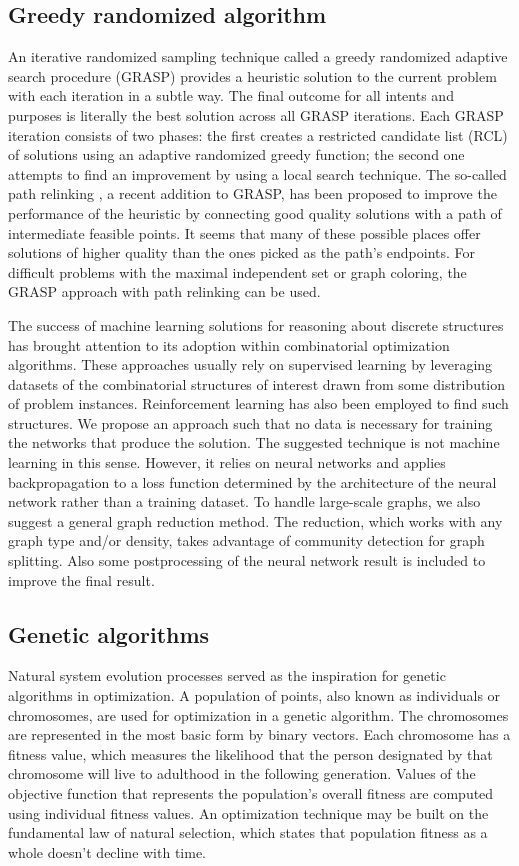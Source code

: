 \subsection{Greedy randomized algorithm}
An iterative randomized sampling technique called a greedy randomized adaptive search procedure (GRASP) provides a heuristic solution to the current problem with each iteration \cite{fr95} in a subtle way. The final outcome for all intents and purposes is literally the best solution across all GRASP iterations. Each GRASP iteration consists of two phases: the first creates a restricted candidate list (RCL) of solutions using an adaptive randomized greedy function; the second one attempts to find an improvement by using a local search technique. 
The so-called path relinking \cite{glm00} , a recent addition to GRASP, has been proposed to improve the performance of the heuristic by connecting good quality solutions with a path of intermediate feasible points. It seems that many of these possible places offer solutions of higher quality than the ones picked as the path's endpoints. For difficult problems with the maximal independent set or graph coloring, the GRASP approach with path relinking can be used.

The success of machine learning solutions for reasoning about discrete structures has brought attention to its adoption within combinatorial optimization algorithms. These approaches usually rely on supervised learning by leveraging datasets of the combinatorial structures of interest drawn from some distribution of problem instances. Reinforcement learning has also been employed to find such structures. We propose an approach such that no data is necessary for training the networks that produce the solution. The suggested technique is not machine learning in this sense. However, it relies on neural networks and applies backpropagation to a loss function determined by the architecture of the neural network rather than a training dataset. To handle large-scale graphs, we also suggest a general graph reduction method. The reduction, which works with any graph type and/or density, takes advantage of community detection for graph splitting. Also some postprocessing of the neural network result is included to improve the final result.

\subsection{Genetic algorithms}

Natural system evolution processes served as the inspiration for genetic algorithms in optimization. A population of points, also known as individuals or chromosomes, are used for optimization in a genetic algorithm. The chromosomes are represented in the most basic form by binary vectors. Each chromosome has a fitness value, which measures the likelihood that the person designated by that chromosome will live to adulthood in the following generation. Values of the objective function that represents the population's overall fitness are computed using individual fitness values. An optimization technique may be built on the fundamental law of natural selection, which states that population fitness as a whole doesn't decline with time.

